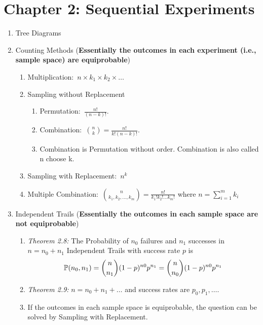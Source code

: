 \section*{Chapter 2: Sequential Experiments}
\begin{enumerate}
    \item Tree Diagrams
    \item Counting Methods (\textbf{Essentially the outcomes in each experiment (i.e., sample space) are equiprobable})
    \begin{enumerate}
        \item Multiplication:~$n\times k_1\times k_2\times \ldots$
        \item Sampling without Replacement
        \begin{enumerate}
            \item Permutation:~$\frac{n!}{(n-k)!}$.
            \item Combination:~$\binom{n}{k}=\frac{n!}{k!(n-k)!}$.
            \item Combination is Permutation without order. Combination is also called n choose k.
        \end{enumerate}
        \item Sampling with Replacement:~$n^k$
        \item Multiple Combination:~$\binom{n}{k_1,k_2,\ldots,k_m}=\frac{n!}{k_1!k_2!\ldots k_m!}$ where $n=\sum_{i=1}^{m}k_i$
    \end{enumerate}
    \item Independent Trails (\textbf{Essentially the outcomes in each sample space are not equiprobable})
    \begin{enumerate}
        \item \textit{Theorem 2.8:} The Probability of $n_0$ failures and $n_1$ successes in $n=n_0+n_1$ Independent Trails with success rate $p$ is \[\P{n_0, n_1}=\binom{n}{n_1}(1-p)^{n0}p^{n_1}=\binom{n}{n_0}(1-p)^{n0}p^{n_1}\]
        \item \textit{Theorem 2.9:} $n=n_0+n_1+\ldots$ and success rates are $p_0, p_1,\ldots$.
        \item If the outcomes in each sample space is equiprobable, the question can be solved by Sampling with Replacement.
    \end{enumerate}
\end{enumerate}